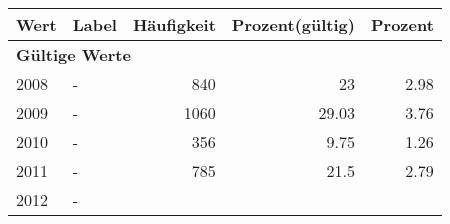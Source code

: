      \begin{longtable}{lXrrr}
     \toprule
     \textbf{Wert} & \textbf{Label} & \textbf{Häufigkeit} & \textbf{Prozent(gültig)} & \textbf{Prozent} \\
     \endhead
     \midrule
     \multicolumn{5}{l}{\textbf{Gültige Werte}}\\

     2008 &
     \multicolumn{1}{X}{ -  } &


       \num{840} &
       \num[round-mode=places,round-precision=2]{23} &
         \num[round-mode=places,round-precision=2]{2.98} \\

     2009 &
     \multicolumn{1}{X}{ -  } &


       \num{1060} &
       \num[round-mode=places,round-precision=2]{29.03} &
         \num[round-mode=places,round-precision=2]{3.76} \\

     2010 &
     \multicolumn{1}{X}{ -  } &


       \num{356} &
       \num[round-mode=places,round-precision=2]{9.75} &
         \num[round-mode=places,round-precision=2]{1.26} \\

     2011 &
     \multicolumn{1}{X}{ -  } &


       \num{785} &
       \num[round-mode=places,round-precision=2]{21.5} &
         \num[round-mode=places,round-precision=2]{2.79} \\

     2012 &
     \multicolumn{1}{X}{ -  } &



\end{longtable}
